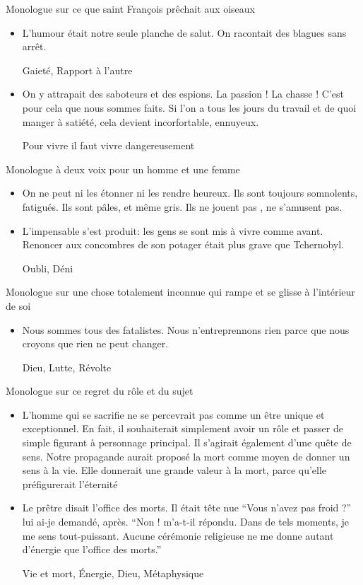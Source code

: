 \documentclass[french,a4paper,11pt,answers]{exam}
\newcommand{\cit}[2]{\og #1 \fg{} \begin{solution}{ #2 }\end{solution}} %
\begin{document}
	\begin{cadre}{Monologue sur ce que saint François prêchait aux oiseaux}
		\begin{itemize}
			\item \cit{L'humour était notre seule planche de salut. On racontait des blagues sans arrêt.}
				{Gaieté, Rapport à l'autre}
			\item \cit {On y attrapait des saboteurs et des espions. La passion ! La chasse ! C'est pour cela que nous sommes faits. Si l'on a tous les jours du travail et de quoi manger à satiété, cela devient incorfortable, ennuyeux.}
				{Pour vivre il faut vivre dangereusement}
		\end{itemize}
	\end{cadre}
	
	\begin{cadre}{Monologue à deux voix pour un homme et une femme}
		\begin{itemize}
			\item \cit{On ne peut ni les étonner ni les rendre heureux. Ils sont toujours somnolents, fatigués. Ils sont pâles, et même gris. Ils ne jouent pas , ne s'amusent pas.}
				{}
			\item \cit{L'impensable s'est produit: les gens se sont mis à vivre comme avant. Renoncer aux concombres de son potager était plus grave que Tchernobyl.}
				{Oubli, Déni}
		\end{itemize}
	\end{cadre}
	
	\begin{cadre}{Monologue sur une chose totalement inconnue qui rampe et se glisse à l'intérieur de soi}
		\begin{itemize}
			\item \cit{Nous sommes tous des fatalistes. Nous n'entreprennons rien parce que nous croyons que rien ne peut changer.}
				{Dieu, Lutte, Révolte}
		\end{itemize}
	\end{cadre}
	
	\begin{cadre}{Monologue sur ce regret du rôle et du sujet}
		\begin{itemize}
			\item \cit{L'homme qui se sacrifie ne se percevrait pas comme un être unique et exceptionnel. En fait, il souhaiterait simplement avoir un rôle et passer de simple figurant à personnage principal. Il s'agirait également d'une quête de sens. Notre propagande aurait proposé la mort comme moyen de donner un sens à la vie. Elle donnerait une grande valeur à la mort, parce qu'elle préfigurerait l'éternité}
				{}
			\item \cit{Le prêtre disait l'office des morts. Il était tête nue  “Vous n'avez pas froid ?'' lui ai-je demandé, après.  “Non ! m'a-t-il répondu. Dans de tels moments, je me sens tout-puissant. Aucune cérémonie religieuse ne me donne autant d'énergie que l'office des morts.''}
				{Vie et mort, Énergie, Dieu, Métaphysique}
		\end{itemize}
	\end{cadre}
	
\end{document}
